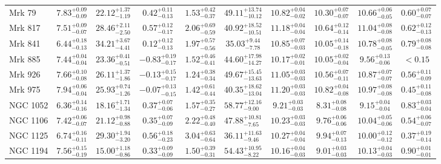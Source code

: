 \documentclass[onecolumn]{mn2e}
\begin{document}
\begin{landscape}
{\begin{center}
\begin{longtable}{lccccccccc}
Mrk 79 & $7.83_{-0.09}^{+0.09}$ & $22.12_{-1.19}^{+1.37}$ & $0.42_{-0.13}^{+0.11}$ & $1.53_{-0.37}^{+0.42}$ &$49.11_{-10.12}^{+13.74}$ & $10.82_{-0.02}^{+0.04}$ & $10.30_{-0.07}^{+0.07}$ & $10.66_{-0.05}^{+0.06}$ & $0.60_{-0.07}^{+0.07}$ \\
Mrk 817 & $7.51_{-0.07}^{+0.09}$ & $28.46_{-2.50}^{+2.11}$ & $0.57_{-0.17}^{+0.12}$ & $2.06_{-0.59}^{+0.69}$ &$40.92_{-10.51}^{+18.52}$ & $11.18_{-0.04}^{+0.04}$ & $10.64_{-0.14}^{+0.12}$ & $11.04_{-0.08}^{+0.08}$ & $0.62_{-0.13}^{+0.12}$ \\
Mrk 841 & $6.44_{-0.13}^{+0.18}$ & $34.21_{-4.41}^{+3.67}$ & $0.12_{-0.13}^{+0.12}$ & $1.97_{-0.56}^{+0.57}$ &$35.03_{-7.78}^{+9.44}$ & $10.85_{-0.03}^{+0.07}$ & $10.05_{-0.18}^{+0.14}$ & $10.78_{-0.05}^{+0.08}$ & $0.79_{-0.08}^{+0.08}$ \\
Mrk 885 & $7.44_{-0.04}^{+0.04}$ & $23.36_{-0.51}^{+0.41}$ & $-0.83_{-0.17}^{+0.19}$ & $1.52_{-0.41}^{+0.46}$ &$44.60_{-14.27}^{+17.98}$ & $10.17_{-0.01}^{+0.02}$ & $10.05_{-0.04}^{+0.02}$ & $9.56_{-0.06}^{+0.13}$ & $<0.15$ \\
Mrk 926 & $7.66_{-0.08}^{+0.10}$ & $26.11_{-1.86}^{+1.37}$ & $-0.13_{-0.17}^{+0.15}$ & $1.24_{-0.34}^{+0.38}$ &$49.67_{-13.63}^{+15.45}$ & $11.05_{-0.03}^{+0.03}$ & $10.56_{-0.11}^{+0.07}$ & $10.87_{-0.07}^{+0.07}$ & $0.56_{-0.09}^{+0.11}$ \\
Mrk 975 & $7.94_{-0.04}^{+0.06}$ & $25.93_{-1.26}^{+0.74}$ & $-0.07_{-0.15}^{+0.13}$ & $1.42_{-0.44}^{+0.61}$ &$40.35_{-13.04}^{+18.62}$ & $11.20_{-0.03}^{+0.03}$ & $10.82_{-0.08}^{+0.04}$ & $10.97_{-0.08}^{+0.08}$ & $0.45_{-0.08}^{+0.11}$ \\
NGC 1052 & $6.36_{-0.16}^{+0.14}$ & $18.16_{-1.34}^{+1.71}$ & $0.37_{-0.06}^{+0.07}$ & $1.57_{-0.27}^{+0.35}$ &$58.77_{-9.00}^{+12.16}$ & $9.21_{-0.03}^{+0.03}$ & $8.31_{-0.08}^{+0.08}$ & $9.15_{-0.04}^{+0.04}$ & $0.83_{-0.04}^{+0.03}$ \\
NGC 1106 & $7.42_{-0.07}^{+0.06}$ & $21.12_{-0.88}^{+0.98}$ & $0.35_{-0.09}^{+0.07}$ & $2.22_{-0.40}^{+0.48}$ &$47.88_{-7.65}^{+10.81}$ & $10.23_{-0.03}^{+0.03}$ & $9.76_{-0.06}^{+0.06}$ & $10.04_{-0.06}^{+0.05}$ & $0.54_{-0.07}^{+0.06}$ \\
NGC 1125 & $6.74_{-0.11}^{+0.16}$ & $29.30_{-3.20}^{+1.94}$ & $0.56_{-0.23}^{+0.18}$ & $3.04_{-0.64}^{+0.63}$ &$36.11_{-9.46}^{+11.63}$ & $10.27_{-0.04}^{+0.04}$ & $9.94_{-0.13}^{+0.07}$ & $10.00_{-0.12}^{+0.12}$ & $0.37_{-0.14}^{+0.19}$ \\
NGC 1194 & $7.56_{-0.19}^{+0.15}$ & $15.00_{-0.86}^{+1.18}$ & $0.33_{-0.09}^{+0.09}$ & $1.50_{-0.31}^{+0.39}$ &$54.43_{-8.22}^{+10.95}$ & $10.16_{-0.03}^{+0.04}$ & $9.01_{-0.03}^{+0.03}$ & $10.13_{-0.03}^{+0.04}$ & $0.90_{-0.01}^{+0.01}$ \\

\end{longtable}
\end{center}}
\end{landscape}
\end{document}
